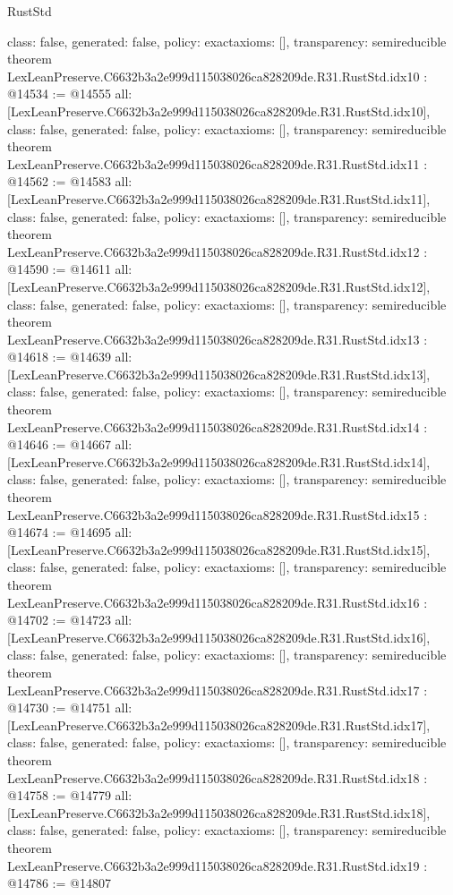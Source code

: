 \begin{lexlean}{RustStd}
\begin{coremodule}
{  class: false,
  generated: false,
  policy: exact{axioms: []},
  transparency: semireducible
}
theorem LexLeanPreserve.C6632b3a2e999d115038026ca828209de.R31.RustStd.idx10 : @14534 := @14555 {
  all: [LexLeanPreserve.C6632b3a2e999d115038026ca828209de.R31.RustStd.idx10],
  class: false,
  generated: false,
  policy: exact{axioms: []},
  transparency: semireducible
}
theorem LexLeanPreserve.C6632b3a2e999d115038026ca828209de.R31.RustStd.idx11 : @14562 := @14583 {
  all: [LexLeanPreserve.C6632b3a2e999d115038026ca828209de.R31.RustStd.idx11],
  class: false,
  generated: false,
  policy: exact{axioms: []},
  transparency: semireducible
}
theorem LexLeanPreserve.C6632b3a2e999d115038026ca828209de.R31.RustStd.idx12 : @14590 := @14611 {
  all: [LexLeanPreserve.C6632b3a2e999d115038026ca828209de.R31.RustStd.idx12],
  class: false,
  generated: false,
  policy: exact{axioms: []},
  transparency: semireducible
}
theorem LexLeanPreserve.C6632b3a2e999d115038026ca828209de.R31.RustStd.idx13 : @14618 := @14639 {
  all: [LexLeanPreserve.C6632b3a2e999d115038026ca828209de.R31.RustStd.idx13],
  class: false,
  generated: false,
  policy: exact{axioms: []},
  transparency: semireducible
}
theorem LexLeanPreserve.C6632b3a2e999d115038026ca828209de.R31.RustStd.idx14 : @14646 := @14667 {
  all: [LexLeanPreserve.C6632b3a2e999d115038026ca828209de.R31.RustStd.idx14],
  class: false,
  generated: false,
  policy: exact{axioms: []},
  transparency: semireducible
}
theorem LexLeanPreserve.C6632b3a2e999d115038026ca828209de.R31.RustStd.idx15 : @14674 := @14695 {
  all: [LexLeanPreserve.C6632b3a2e999d115038026ca828209de.R31.RustStd.idx15],
  class: false,
  generated: false,
  policy: exact{axioms: []},
  transparency: semireducible
}
theorem LexLeanPreserve.C6632b3a2e999d115038026ca828209de.R31.RustStd.idx16 : @14702 := @14723 {
  all: [LexLeanPreserve.C6632b3a2e999d115038026ca828209de.R31.RustStd.idx16],
  class: false,
  generated: false,
  policy: exact{axioms: []},
  transparency: semireducible
}
theorem LexLeanPreserve.C6632b3a2e999d115038026ca828209de.R31.RustStd.idx17 : @14730 := @14751 {
  all: [LexLeanPreserve.C6632b3a2e999d115038026ca828209de.R31.RustStd.idx17],
  class: false,
  generated: false,
  policy: exact{axioms: []},
  transparency: semireducible
}
theorem LexLeanPreserve.C6632b3a2e999d115038026ca828209de.R31.RustStd.idx18 : @14758 := @14779 {
  all: [LexLeanPreserve.C6632b3a2e999d115038026ca828209de.R31.RustStd.idx18],
  class: false,
  generated: false,
  policy: exact{axioms: []},
  transparency: semireducible
}
theorem LexLeanPreserve.C6632b3a2e999d115038026ca828209de.R31.RustStd.idx19 : @14786 := @14807 {
}
\end{coremodule}
\end{lexlean}
